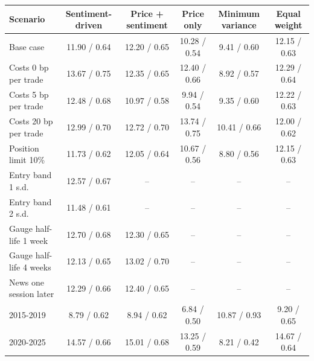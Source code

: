 \begin{tabular}{lccccc}
\toprule
Scenario & Sentiment-driven & Price + sentiment & Price only & Minimum variance & Equal weight \\
\midrule
Base case & 11.90 / 0.64 & 12.20 / 0.65 & 10.28 / 0.54 & 9.41 / 0.60 & 12.15 / 0.63 \\
Costs 0 bp per trade & 13.67 / 0.75 & 12.35 / 0.65 & 12.40 / 0.66 & 8.92 / 0.57 & 12.29 / 0.64 \\
Costs 5 bp per trade & 12.48 / 0.68 & 10.97 / 0.58 & 9.94 / 0.54 & 9.35 / 0.60 & 12.22 / 0.63 \\
Costs 20 bp per trade & 12.99 / 0.70 & 12.72 / 0.70 & 13.74 / 0.75 & 10.41 / 0.66 & 12.00 / 0.62 \\
Position limit 10\% & 11.73 / 0.62 & 12.05 / 0.64 & 10.67 / 0.56 & 8.80 / 0.56 & 12.15 / 0.63 \\
Entry band 1 s.d. & 12.57 / 0.67 & -- & -- & -- & -- \\
Entry band 2 s.d. & 11.48 / 0.61 & -- & -- & -- & -- \\
Gauge half-life 1 week & 12.70 / 0.68 & 12.30 / 0.65 & -- & -- & -- \\
Gauge half-life 4 weeks & 12.13 / 0.65 & 13.02 / 0.70 & -- & -- & -- \\
News one session later & 12.29 / 0.66 & 12.40 / 0.65 & -- & -- & -- \\
2015-2019 & 8.79 / 0.62 & 8.94 / 0.62 & 6.84 / 0.50 & 10.87 / 0.93 & 9.20 / 0.65 \\
2020-2025 & 14.57 / 0.66 & 15.01 / 0.68 & 13.25 / 0.59 & 8.21 / 0.42 & 14.67 / 0.64 \\
\bottomrule
\end{tabular}
